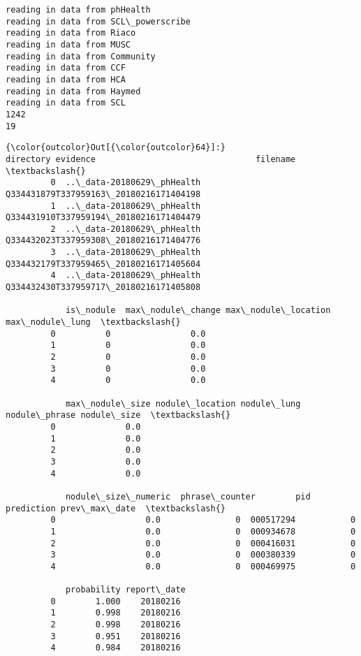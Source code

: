 \documentclass[11pt]{article}
\begin{document}
    \begin{Verbatim}[commandchars=\\\{\}]
reading in data from phHealth
reading in data from SCL\_powerscribe
reading in data from Riaco
reading in data from MUSC
reading in data from Community
reading in data from CCF
reading in data from HCA
reading in data from Haymed
reading in data from SCL
1242
19

    \end{Verbatim}

\begin{Verbatim}[commandchars=\\\{\}]
{\color{outcolor}Out[{\color{outcolor}64}]:}                    directory evidence                                filename  \textbackslash{}
         0  ..\_data-20180629\_phHealth           Q334431879T337959163\_20180216171404198   
         1  ..\_data-20180629\_phHealth           Q334431910T337959194\_20180216171404479   
         2  ..\_data-20180629\_phHealth           Q334432023T337959308\_20180216171404776   
         3  ..\_data-20180629\_phHealth           Q334432179T337959465\_20180216171405604   
         4  ..\_data-20180629\_phHealth           Q334432430T337959717\_20180216171405808   
         
            is\_nodule  max\_nodule\_change max\_nodule\_location max\_nodule\_lung  \textbackslash{}
         0          0                0.0                                       
         1          0                0.0                                       
         2          0                0.0                                       
         3          0                0.0                                       
         4          0                0.0                                       
         
            max\_nodule\_size nodule\_location nodule\_lung nodule\_phrase nodule\_size  \textbackslash{}
         0              0.0                                                         
         1              0.0                                                         
         2              0.0                                                         
         3              0.0                                                         
         4              0.0                                                         
         
            nodule\_size\_numeric  phrase\_counter        pid  prediction prev\_max\_date  \textbackslash{}
         0                  0.0               0  000517294           0                 
         1                  0.0               0  000934678           0                 
         2                  0.0               0  000416031           0                 
         3                  0.0               0  000380339           0                 
         4                  0.0               0  000469975           0                 
         
            probability report\_date  
         0        1.000    20180216  
         1        0.998    20180216  
         2        0.998    20180216  
         3        0.951    20180216  
         4        0.984    20180216  
\end{Verbatim}
            
\end{document}
